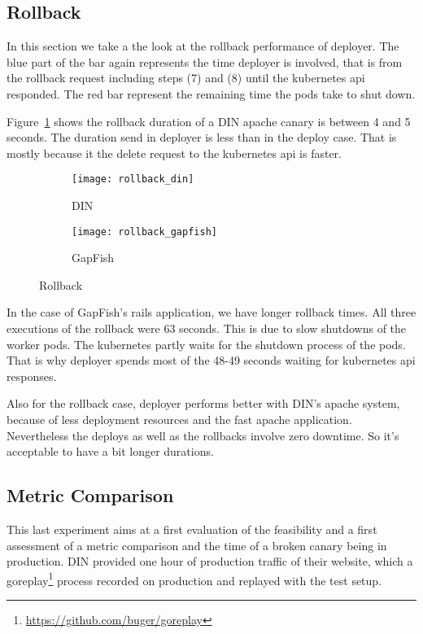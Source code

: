 \subsection{Rollback}

In this section we take a the look at the rollback performance of deployer. The blue part
of the bar again represents the time deployer is involved, that is from the rollback
request including steps (7) and (8) until the kubernetes api responded. The red bar
represent the remaining time the pods take to shut down.

Figure~\ref{fig:rollback_din} shows the rollback duration of a DIN apache canary
is between 4 and 5 seconds. The duration send in deployer is less than in the deploy case.
That is mostly because it the delete request to the kubernetes api is faster.

\begin{figure}[htbp]
  \centering
  \begin{subfigure}{.5\textwidth}
    \texttt{[image: rollback\_din]}
    \caption[DIN]{DIN}
    \label{fig:rollback_din}
  \end{subfigure}%
  \begin{subfigure}{.5\textwidth}
    \texttt{[image: rollback\_gapfish]}
    \caption[GapFish]{GapFish}
    \label{fig:rollback_gapfish}
  \end{subfigure}
  \caption[Deploy]{Rollback}
\end{figure}

In the case of GapFish's rails application, we have longer rollback times. All three
executions of the rollback were 63 seconds. This is due to slow shutdowns of the worker
pods. The kubernetes partly waits for the shutdown process of the pods. That is why
deployer spends most of the 48-49 seconds waiting for kubernetes api responses.

Also for the rollback case, deployer performs better with DIN's apache system, because of
less deployment resources and the fast apache application. Nevertheless the deploys as
well as the rollbacks involve zero downtime. So it's acceptable to have a bit longer
durations.

\subsection{Metric Comparison}

This last experiment aims at a first evaluation of the feasibility and a first assessment
of a metric comparison and the time of a broken canary being in production. DIN provided
one hour of production traffic of their website, which a
goreplay\footnote{\url{https://github.com/buger/goreplay}} process recorded on production
and replayed with the test setup.

